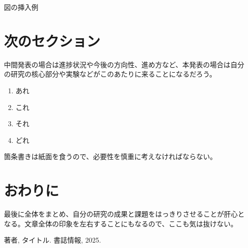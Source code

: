 \documentclass{jabstract}
\begin{document}
\begin{multicols}{2}
\begin{figurehere}
  \noindent
  \parbox{\linewidth}{
    \centering
    \caption{図の挿入例}\label{fig:sample}
  }%
\end{figurehere}

\section{次のセクション}
中間発表の場合は進捗状況や今後の方向性、進め方など、本発表の場合は自分
の研究の核心部分や実験などがこのあたりに来ることになるだろう。

\begin{enumerate}
\item あれ
\item これ
\item それ
\item どれ
\end{enumerate}
箇条書きは紙面を食うので、必要性を慎重に考えなければならない。

\section*{おわりに}
最後に全体をまとめ、自分の研究の成果と課題をはっきりさせることが肝心と
なる。文章全体の印象を左右することにもなるので、ここも気は抜けない。

%

{\small
\begin{thebibliography}{99}
   著者, タイトル. 書誌情報, 2025.
\end{thebibliography}
}

\end{multicols}
\end{document}

